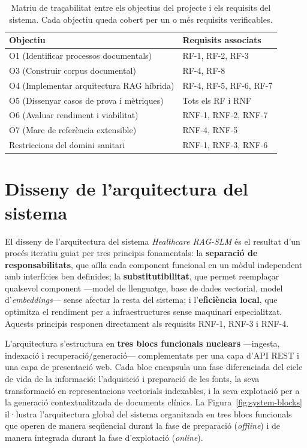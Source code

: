 \documentclass[CAT]{TFUOC}%
\begin{document}
\begin{table}[H]
\centering
\small
\begin{tabular}{lp{8.5cm}}
\hline
\textbf{Objectiu} & \textbf{Requisits associats} \\
\hline
O1 (Identificar processos documentals) & RF-1, RF-2, RF-3 \\
O3 (Construir corpus documental) & RF-4, RF-8 \\
O4 (Implementar arquitectura RAG híbrida) & RF-4, RF-5, RF-6, RF-7 \\
O5 (Dissenyar casos de prova i mètriques) & Tots els RF i RNF \\
O6 (Avaluar rendiment i viabilitat) & RNF-1, RNF-2, RNF-7 \\
O7 (Marc de referència extensible) & RNF-4, RNF-5 \\
Restriccions del domini sanitari & RNF-1, RNF-3, RNF-6 \\
\hline
\end{tabular}
\caption{Matriu de traçabilitat entre els objectius del projecte i els requisits del sistema. Cada objectiu queda cobert per un o més requisits verificables.}
\label{tab:traceability}
\end{table}

\section{Disseny de l'arquitectura del sistema}

El disseny de l'arquitectura del sistema \textit{Healthcare RAG-SLM} és el resultat d'un procés iteratiu guiat per tres principis fonamentals: la \textbf{separació de responsabilitats}, que aïlla cada component funcional en un mòdul independent amb interfícies ben definides; la \textbf{substitutibilitat}, que permet reemplaçar qualsevol component ---model de llenguatge, base de dades vectorial, model d'\textit{embeddings}--- sense afectar la resta del sistema; i l'\textbf{eficiència local}, que optimitza el rendiment per a infraestructures sense maquinari especialitzat. Aquests principis responen directament als requisits RNF-1, RNF-3 i RNF-4.

L'arquitectura s'estructura en \textbf{tres blocs funcionals nuclears} ---ingesta, indexació i recuperació/generació--- complementats per una capa d'API REST i una capa de presentació web. Cada bloc encapsula una fase diferenciada del cicle de vida de la informació: l'adquisició i preparació de les fonts, la seva transformació en representacions vectorials indexables, i la seva explotació per a la generació contextualitzada de documents clínics. La Figura~\ref{fig:system-blocks} il·lustra l'arquitectura global del sistema organitzada en tres blocs funcionals que operen de manera seqüencial durant la fase de preparació (\textit{offline}) i de manera integrada durant la fase d'explotació (\textit{online}).
\end{document}
